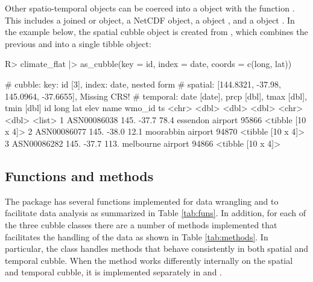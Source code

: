 \documentclass[
  shortnames]{jss}
\begin{document}
Other  spatio-temporal objects can be coerced into a  object with the function . This includes a joined  or  object, a NetCDF object, a  object \citep{stars}, and a  object \citep{sftime}. In the example below, the spatial cubble object is created from , which combines the previous  and  into a single tibble object:

\begin{CodeChunk}
\begin{CodeInput}
R> climate_flat |> as_cubble(key = id, index = date, coords = c(long, lat))
\end{CodeInput}
\begin{CodeOutput}
# cubble:   key: id [3], index: date, nested form
# spatial:  [144.8321, -37.98, 145.0964, -37.6655], Missing CRS!
# temporal: date [date], prcp [dbl], tmax [dbl], tmin [dbl]
  id           long   lat  elev name              wmo_id ts               
  <chr>       <dbl> <dbl> <dbl> <chr>              <dbl> <list>           
1 ASN00086038  145. -37.7  78.4 essendon airport   95866 <tibble [10 x 4]>
2 ASN00086077  145. -38.0  12.1 moorabbin airport  94870 <tibble [10 x 4]>
3 ASN00086282  145. -37.7 113.  melbourne airport  94866 <tibble [10 x 4]>
\end{CodeOutput}
\end{CodeChunk}

\hypertarget{functions-and-methods}{%
\subsection{Functions and methods}\label{functions-and-methods}}

The  package has several functions implemented for data wrangling and to facilitate data analysis as summarized in Table \ref{tab:funs}. In addition, for each of the three cubble classes there are a number of methods implemented that facilitates the handling of the data as shown in Table \ref{tab:methods}. In particular, the  class handles methods that behave consistently in both spatial and temporal cubble. When the method works differently internally on the spatial and temporal cubble, it is implemented separately in  and .
\end{document}
